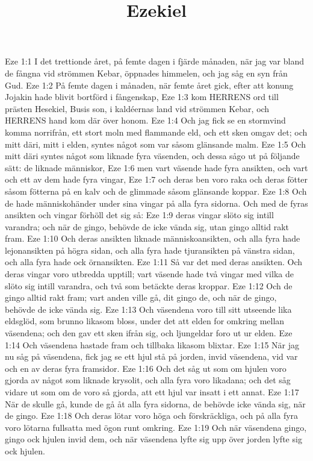

\title{Ezekiel}

Eze 1:1  I det trettionde året, på femte dagen i fjärde månaden, när jag var bland de fångna vid strömmen Kebar, öppnades himmelen, och jag såg en syn från Gud.
Eze 1:2  På femte dagen i månaden, när femte året gick, efter att konung Jojakin hade blivit bortförd i fångenskap,
Eze 1:3  kom HERRENS ord till prästen Hesekiel, Busis son, i kaldéernas land vid strömmen Kebar, och HERRENS hand kom där över honom.
Eze 1:4  Och jag fick se en stormvind komma norrifrån, ett stort moln med flammande eld, och ett sken omgav det; och mitt däri, mitt i elden, syntes något som var såsom glänsande malm.
Eze 1:5  Och mitt däri syntes något som liknade fyra väsenden, och dessa sågo ut på följande sätt: de liknade människor,
Eze 1:6  men vart väsende hade fyra ansikten, och vart och ett av dem hade fyra vingar,
Eze 1:7  och deras ben voro raka och deras fötter såsom fötterna på en kalv och de glimmade såsom glänsande koppar.
Eze 1:8  Och de hade människohänder under sina vingar på alla fyra sidorna. Och med de fyras ansikten och vingar förhöll det sig så:
Eze 1:9  deras vingar slöto sig intill varandra; och när de gingo, behövde de icke vända sig, utan gingo alltid rakt fram.
Eze 1:10  Och deras ansikten liknade människoansikten, och alla fyra hade lejonansikten på högra sidan, och alla fyra hade tjuransikten på vänstra sidan, och alla fyra hade ock örnansikten.
Eze 1:11  Så var det med deras ansikten. Och deras vingar voro utbredda upptill; vart väsende hade två vingar med vilka de slöto sig intill varandra, och två som betäckte deras kroppar.
Eze 1:12  Och de gingo alltid rakt fram; vart anden ville gå, dit gingo de, och när de gingo, behövde de icke vända sig.
Eze 1:13  Och väsendena voro till sitt utseende lika eldsglöd, som brunno likasom bloss, under det att elden for omkring mellan väsendena; och den gav ett sken ifrån sig, och ljungeldar foro ut ur elden.
Eze 1:14  Och väsendena hastade fram och tillbaka likasom blixtar.
Eze 1:15  När jag nu såg på väsendena, fick jag se ett hjul stå på jorden, invid väsendena, vid var och en av deras fyra framsidor.
Eze 1:16  Och det såg ut som om hjulen voro gjorda av något som liknade krysolit, och alla fyra voro likadana; och det såg vidare ut som om de voro så gjorda, att ett hjul var insatt i ett annat.
Eze 1:17  När de skulle gå, kunde de gå åt alla fyra sidorna, de behövde icke vända sig, när de gingo.
Eze 1:18  Och deras lötar voro höga och förskräckliga, och på alla fyra voro lötarna fullsatta med ögon runt omkring.
Eze 1:19  Och när väsendena gingo, gingo ock hjulen invid dem, och när väsendena lyfte sig upp över jorden lyfte sig ock hjulen.
